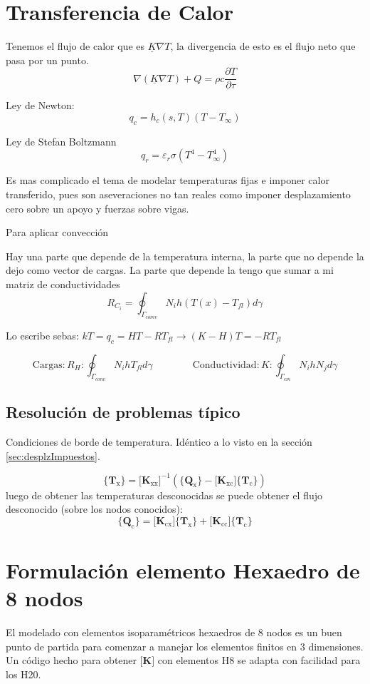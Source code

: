 \documentclass[11pt, a4paper,titlepage]{article}
\newcommand{\Mme}[1]{\boldsymbol{[}\mathbf{#1} \boldsymbol{]}}
\newcommand{\Cme}[1]{\boldsymbol{\{ }\mathbf{#1} \boldsymbol{\}} }
\newcommand{\MK}{\Mme{K}}
\begin{document}
\section{Transferencia de Calor}

Tenemos el flujo de calor que es $\underline{K} \nabla T$, la divergencia de esto es el flujo neto que pasa por un punto.
\[
\nabla(\underline{K} \nabla T)+Q=\rho c \frac{\partial T}{\partial \tau}
\] 

Ley de Newton: 
\[
q_{c}=h_{c}(s, T)\left(T-T_{\infty}\right)
\]

Ley de Stefan Boltzmann
\[
q_{r}=\varepsilon_{r} \sigma\left(T^{4}-T_{\infty}^{4}\right)
\]

Es mas complicado el tema de modelar temperaturas fijas e imponer calor transferido, pues son aseveraciones no tan reales como imponer desplazamiento cero sobre un apoyo y  fuerzas sobre vigas.

Para aplicar convección 

Hay una parte que depende de la temperatura interna, la parte que no depende la dejo como vector de cargas. La parte que depende la tengo que sumar a mi matriz de conductividades
\[
R_{C_{i}}=\oint_{\Gamma_{c o m v}} N_{i} h\left(T(x)-T_{f l}\right) d \gamma
\]

Lo escribe sebas: $kT=q_c = HT-RT_{fl} \longrightarrow (K-H)T = -R T_{fl}$

\[
\mathrm{Cargas:} R_{H} : \oint_{\Gamma_{c o n v}} N_{i} h T_{f l} d \gamma \qquad \qquad \mathrm{Conductividad:}  K : \oint_{\Gamma_{c m}} N_{i} h N_{j} d \gamma
\]


\subsection*{Resolución de problemas típico}

Condiciones de borde de temperatura. Idéntico a lo visto en la sección \ref{sec:desplzImpuestos}.

\[
\Cme{T_{\mathrm{x}}} = \Mme{K_{\mathrm{xx}}}^{-1} \left( \Cme{Q_\mathrm{x}}- \Mme{K_{\mathrm{xc}}}  \Cme{T_\mathrm{c}} \right)
\]
luego de obtener las temperaturas desconocidas se puede obtener el flujo desconocido (sobre los nodos conocidos):
\[
\Cme{Q_{\mathrm{c}}} = \Mme{K_{\mathrm{cx}}} \Cme{T_\mathrm{x}} + \Mme{K_{\mathrm{cc}}} \Cme{T_\mathrm{c}}  
\]





\section{Formulación elemento Hexaedro de 8 nodos}
\newcommand{\dof}{\ensuremath{\mathrm{dof}}}
El modelado con elementos isoparamétricos hexaedros de 8 nodos es un buen punto de partida para comenzar a manejar los elementos finitos en 3 dimensiones. Un código hecho para obtener $\MK$ con elementos H8 se adapta con facilidad para los H20.
\end{document}
